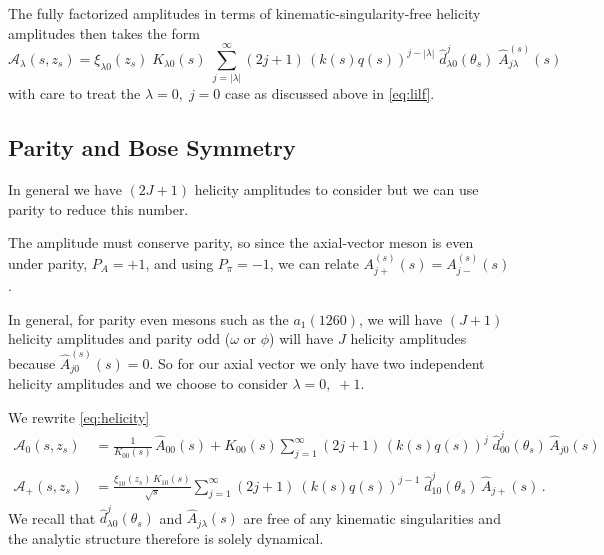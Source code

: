 \documentclass[10pt, aps,prd,amsmath,amssymb,superscriptaddress,onecolumn,
nofootinbib,showpacs,preprintnumbers]{revtex4-1}
\begin{document}
The fully factorized amplitudes in terms of kinematic-singularity-free helicity amplitudes then takes the form
  \begin{equation}
    \label{eq:helicity-final}
    \mathcal{A}_\lambda(s,z_s) = \xi_{\lambda0}(z_s) \; K_{\lambda0}(s) \;  \sum_{j= |\lambda|}^\infty (2j+1) \, (k(s)q(s))^{j- |\lambda|} \; \hat{d}^j_{\lambda0}(\theta_s)  \; \hat{A}^{(s)}_{j\lambda}(s)
  \end{equation}
with care to treat the \(\lambda =0, \;  j=0\) case as discussed above in \cref{eq:lilf}.
\subsection{Parity and Bose Symmetry} \label{sec:symmetry}
In general we have \((2J+1)\) helicity amplitudes to consider but we can use parity to reduce this number.

The amplitude must conserve parity, so since the axial-vector meson is even under parity, \( P_A = +1\), and using \(P_\pi = -1\), we can relate \(A_{j+}^{(s)}(s) = A_{j-}^{(s)}(s)\).

In general, for parity even mesons such as the \(a_1(1260)\), we will have \((J +1)\) helicity amplitudes and parity odd (\(\omega \text{ or } \phi\)) will have \(J\) helicity amplitudes because \(\hat{A}^{(s)}_{j0}(s) = 0\). So for our axial vector we only have two independent helicity amplitudes and we choose to consider \(\lambda = 0,\; +1\).

We rewrite \cref{eq:helicity}
  \begin{align}
    \label{eq:model-helicity-zero}
    \mathcal{A}_0(s,z_s) &= \frac{1}{K_{00}(s)} \, \hat{A}_{00}(s) + K_{00}(s) \sum_{j = 1}^\infty (2j+1) \, (k(s)q(s))^j \; \hat{d}_{00}^j(\theta_s) \, \hat{A}_{j0}(s) \\
    \nonumber \\
    \label{eq:model-helicity-plus}
    \mathcal{A}_+(s,z_s) &=  \frac{\xi_{10}(z_s) \, K_{10}(s)}{\sqrt{s}} \sum_{j = 1}^\infty (2j+1) \ (k(s)q(s))^{j-1} \;  \hat{d}_{10}^j(\theta_s) \, \hat{A}_{j+}(s) \,.
   \end{align}
We recall that \(\hat{d}^j_{\lambda 0}(\theta_s)\) and \(\hat{A}_{j\lambda}(s)\) are free of any kinematic singularities and the analytic structure therefore is solely dynamical.
\end{document}
